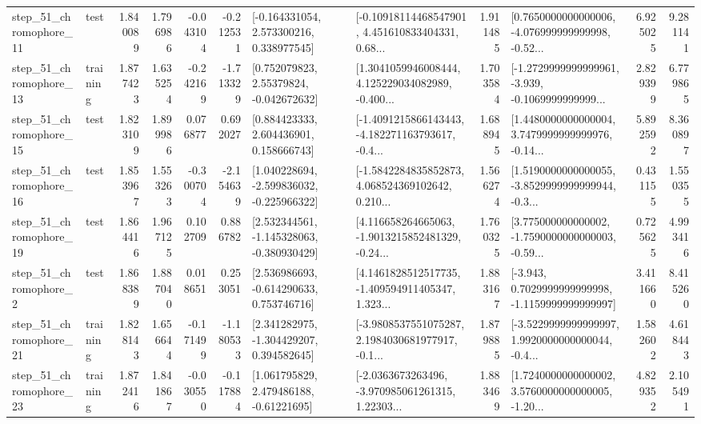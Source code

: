 \begin{tabular}{llrrrrllrlrr}
   step\_51\_chromophore\_11 &      test &      1.840089 &    1.796986 &     -0.043104 & -0.212531 &    [-0.164331054, 2.573300216, 0.338977545] &  [-0.10918114468547901, 4.451610833404331, 0.68... &       1.911485 &  [0.7650000000000006, -4.076999999999998, -0.52... &            6.925025 &          9.281141 \\
   step\_51\_chromophore\_13 &  training &      1.877423 &    1.635254 &     -0.242169 & -1.713329 &     [0.752079823, 2.55379824, -0.042672632] &  [1.3041059946008444, 4.125229034082989, -0.400... &       1.703584 &  [-1.2729999999999961, -3.939, -0.1069999999999... &            2.829399 &          6.779865 \\
   step\_51\_chromophore\_15 &      test &      1.823109 &    1.899986 &      0.076877 &  0.692027 &     [0.884423333, 2.604436901, 0.158666743] &  [-1.4091215866143443, -4.182271163793617, -0.4... &       1.688945 &  [1.4480000000000004, 3.7479999999999976, -0.14... &            5.892592 &          8.360897 \\
   step\_51\_chromophore\_16 &      test &      1.853967 &    1.553263 &     -0.300704 & -2.154639 &   [1.040228694, -2.599836032, -0.225966322] &  [-1.5842284835852873, 4.068524369102642, 0.210... &       1.566274 &  [1.5190000000000055, -3.8529999999999944, -0.3... &            0.431155 &          1.550355 \\
   step\_51\_chromophore\_19 &      test &      1.864416 &    1.967125 &      0.102709 &  0.886782 &   [2.532344561, -1.145328063, -0.380930429] &  [4.116658264665063, -1.9013215852481329, -0.24... &       1.760325 &  [3.775000000000002, -1.7590000000000003, -0.59... &            0.725625 &          4.993416 \\
    step\_51\_chromophore\_2 &      test &      1.868389 &    1.887040 &      0.018651 &  0.253051 &    [2.536986693, -0.614290633, 0.753746716] &  [4.1461828512517735, -1.409594911405347, 1.323... &       1.883167 &  [-3.943, 0.7029999999999998, -1.1159999999999997] &            3.411660 &          8.415260 \\
   step\_51\_chromophore\_21 &  training &      1.828143 &    1.656644 &     -0.171499 & -1.180533 &    [2.341282975, -1.304429207, 0.394582645] &  [-3.9808537551075287, 2.1984030681977917, -0.1... &       1.879885 &  [-3.5229999999999997, 1.9920000000000044, -0.4... &            1.582602 &          4.618443 \\
   step\_51\_chromophore\_23 &  training &      1.872416 &    1.841867 &     -0.030550 & -0.117884 &     [1.061795829, 2.479486188, -0.61221695] &  [-2.0363673263496, -3.970985061261315, 1.22303... &       1.883469 &  [1.7240000000000002, 3.5760000000000005, -1.20... &            4.829352 &          2.105491 \\

\end{tabular}
